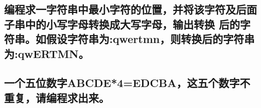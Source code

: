 ﻿\documentclass  [11pt,onecolumn]{article}
\begin{document}
\subsection{编程求一字符串中最小字符的位置，并将该字符及后面子串中的小写字母转换成大写字母，输出转换
  后的字符串。如假设字符串为:qwertmn，则转换后的字符串为:qwERTMN。}

\pagebreak
\begin{minipage}{1\textwidth}
\vspace{40ex}
\subsection{一个五位数字ABCDE*4=EDCBA，这五个数字不重复，请编程求出来。}
\end{minipage}
\pagebreak
\begin{minipage}{1\textwidth}
\vspace{60ex}
\end{minipage}
\end{document}
